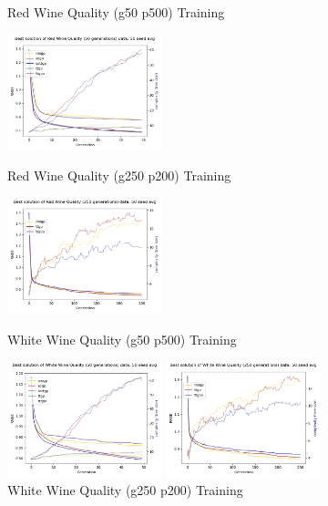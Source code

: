 \documentclass[a4paper, twocolumn]{article}
\begin{document}
\begin{figure}[!htb]
	\caption{Red Wine Quality (g50 p500) Training}
	\includegraphics[width=0.40\textwidth]{Red Wine Quality (50 generations)-besttrain-evo}
	\caption{Red Wine Quality (g250 p200) Training}
	\includegraphics[width=0.40\textwidth]{Red Wine Quality (250 generations)-besttrain-evo}
	\caption{White Wine Quality (g50 p500) Training}
	\includegraphics[width=0.40\textwidth]{White Wine Quality (50 generations)-besttrain-evo}
	\caption{White Wine Quality (g250 p200) Training}
	\includegraphics[width=0.40\textwidth]{White Wine Quality (250 generations)-besttrain-evo}
\end{figure}
\end{document}
